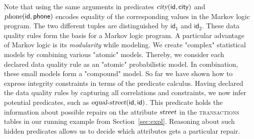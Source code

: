 Note that using the same arguments in predicates $\mathsf{\textsl{city}(id, city)}$ and $\mathsf{\textsl{phone}(id, phone)}$ encodes equality of the corresponding values in the Markov logic program. The two different tuples are distinguished by $\mathsf{id_1}$ and $\mathsf{id_2}$. 
These data quality rules form the basis for a Markov logic program. A particular advantage of Markov logic is its \textit{modularity} while modeling. We create "complex" statistical models by combining various "atomic" models. Thereby, we consider each declared data quality rule as an "atomic" probabilistic model. In combination, these small models form a "compound" model. So far we have shown how to express integrity constraints in terms of the predicate calculus.
Having declared the data quality rules by capturing all correlations and constraints, we now infer potential predicates, such as $\mathsf{\textsl{equal-street}(id, id)}$. This predicate holds the information about possible repairs on the attribute $\mathsf{\textsl{street}}$ in the \textsc{transactions} tables in our running example from Section~\ref{sec:expl}. Reasoning about such hidden predicates allows us to decide which attributes gets a particular repair. 

